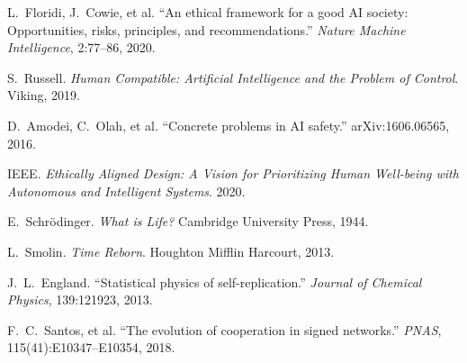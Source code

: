 \documentclass[11pt]{article}
\begin{document}
\begin{thebibliography}{99}
 L.~Floridi, J.~Cowie, et al. ``An ethical framework for a good AI society: Opportunities, risks, principles, and recommendations.'' \emph{Nature Machine Intelligence}, 2:77--86, 2020.

 S.~Russell. \emph{Human Compatible: Artificial Intelligence and the Problem of Control}. Viking, 2019.

 D.~Amodei, C.~Olah, et al. ``Concrete problems in AI safety.'' arXiv:1606.06565, 2016.

 IEEE. \emph{Ethically Aligned Design: A Vision for Prioritizing Human Well-being with Autonomous and Intelligent Systems}. 2020.

 E.~Schr\"odinger. \emph{What is Life?} Cambridge University Press, 1944.

 L.~Smolin. \emph{Time Reborn}. Houghton Mifflin Harcourt, 2013.

 J.~L.~England. ``Statistical physics of self-replication.'' \emph{Journal of Chemical Physics}, 139:121923, 2013.

 F.~C.~Santos, et al. ``The evolution of cooperation in signed networks.'' \emph{PNAS}, 115(41):E10347–E10354, 2018.
\end{thebibliography}
\end{document}

